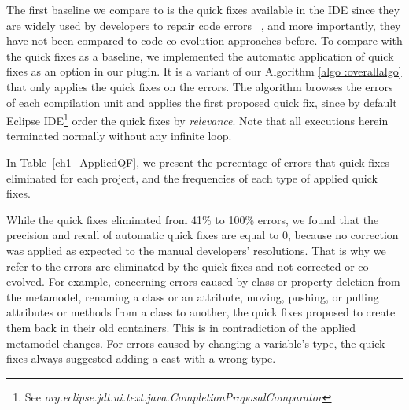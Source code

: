The first baseline we compare to is the quick fixes available in the IDE since they are widely used by developers to repair code errors%
%
~\cite{10.1145/2384616.2384665}, and more importantly, they have not been compared to code co-evolution approaches before. 
To compare with the quick fixes as a baseline, we implemented the automatic application of quick fixes as an option in our plugin. It is a variant of our Algorithm \ref{algo :overallalgo} that only applies the quick fixes on the errors. 
The algorithm browses the errors of each compilation unit and applies the first proposed quick fix, since by default Eclipse IDE\footnote{See \emph{org.eclipse.jdt.ui.text.java.CompletionProposalComparator}} order the quick fixes by \emph{relevance}. Note that all executions herein terminated normally without any infinite loop.




In Table~\ref{ch1_AppliedQF}, we present the percentage of errors that quick fixes eliminated for each project, and the frequencies of each type of applied quick fixes. 

While the quick fixes eliminated from 41\% to 100\% errors, we found that the precision and recall of automatic quick fixes are equal to 0, because no correction was applied as expected to the manual developers' resolutions. That is why we refer to the errors are eliminated by the quick fixes and not corrected or co-evolved. 
For example, concerning errors caused by class or property deletion from the metamodel, renaming a class or an attribute, moving, pushing, or pulling attributes or methods from a class to another, the quick fixes proposed to create them back in their old containers. This is in contradiction of the applied metamodel changes.  
For errors caused by changing a variable's type, the quick fixes always suggested adding a cast with a wrong type. 

